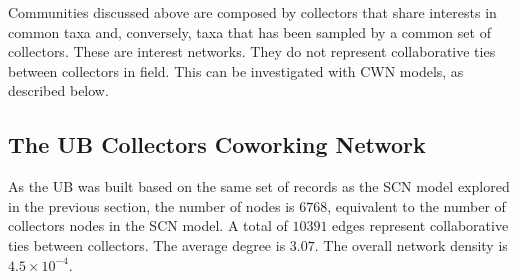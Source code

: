


Communities discussed above are composed by collectors that share interests in common taxa and, conversely, taxa that has been sampled by a common set of collectors.
These are interest networks.
They do not represent collaborative ties between collectors in field.
This can be investigated with CWN models, as described below.




\subsection{The UB Collectors Coworking Network}

As the UB was built based on the same set of records as the SCN model explored in the previous section, the number of nodes is $6768$, equivalent to the number of collectors nodes in the SCN model.
A total of $10391$ edges represent collaborative ties between collectors.
The average degree is $3.07$.
The overall network density is $4.5 \times 10^{-4}$.

